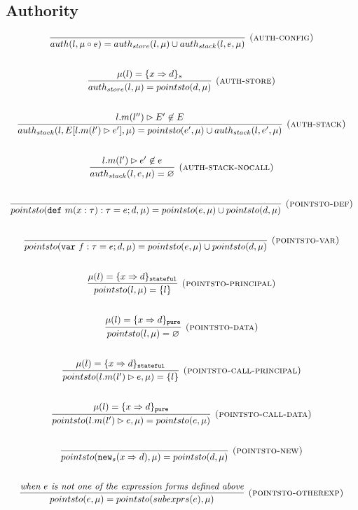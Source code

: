 \documentclass{llncs}
\newcommand{\keywadj}[1]{\mathtt{#1}}
\newcommand{\keyw}[1]{\keywadj{#1}~}
\begin{document}
\newpage

\subsection{Authority}

\[
\begin{array}{c}
\infer[\textsc{(auth-config)}]
  {auth(l,\mu \circ e) = auth_{store}(l,\mu) \cup auth_{stack}(l,e,\mu)}
  {}\\[5ex]

\infer[\textsc{(auth-store)}]
  {auth_{store}(l,\mu) = pointsto(d,\mu)}
  {\mu(l) = \{ x \Rightarrow d \}_{s}}\\[5ex]
  
\infer[\textsc{(auth-stack)}]
  {auth_{stack}(l,E[l.m(l') \rhd e'],\mu) = pointsto(e',\mu) \cup auth_{stack}(l,e',\mu)}
  {l.m(l'') \rhd E' \not\in E}\\[5ex]
  
\infer[\textsc{(auth-stack-nocall)}]
  {auth_{stack}(l,e,\mu) = \varnothing}
  {l.m(l') \rhd e' \not\in e}\\[5ex]
  
\infer[\textsc{(pointsto-def)}]
  {pointsto(\keyw{def} m(x:\tau):\tau = e; d,\mu) = pointsto(e,\mu) \cup pointsto(d,\mu)}
  {}\\[5ex]
  
\infer[\textsc{(pointsto-var)}]
  {pointsto(\keyw{var} f:\tau = e; d,\mu) = pointsto(e,\mu) \cup pointsto(d,\mu)}
  {}\\[5ex]
  
\infer[\textsc{(pointsto-principal)}]
  {pointsto(l,\mu) = \{ l \}}
  {\mu(l) = \{ x \Rightarrow d \}_\keywadj{stateful}}\\[5ex]
  
\infer[\textsc{(pointsto-data)}]
  {pointsto(l,\mu) = \varnothing }
  {\mu(l) = \{ x \Rightarrow d \}_\keywadj{pure}}\\[5ex]

\infer[\textsc{(pointsto-call-principal)}]
  {pointsto(l.m(l') \rhd e,\mu) = \{l\} }
  {\mu(l) = \{ x \Rightarrow d \}_\keywadj{stateful}}\\[5ex]
  
\infer[\textsc{(pointsto-call-data)}]
  {pointsto(l.m(l') \rhd e,\mu) = pointsto(e,\mu)}
  {\mu(l) = \{ x \Rightarrow d \}_\keywadj{pure}}\\[5ex]
  
\infer[\textsc{(pointsto-new)}]
  {pointsto(\keywadj{new}_{s}(x \Rightarrow d),\mu) = pointsto(d,\mu) }
  {}\\[5ex]
  
\infer[\textsc{(pointsto-otherexp)}]
  {pointsto(e,\mu) = pointsto(subexprs(e),\mu) }
  {\textit{when $e$ is not one of the expression forms defined above}}\\[5ex]

\end{array}
\]
\end{document}
